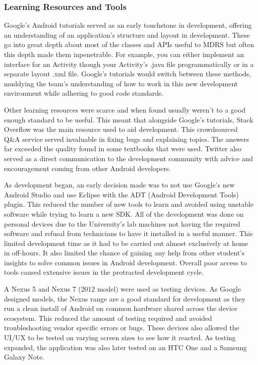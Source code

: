 \documentclass{l3proj}
\begin{document}
\subsubsection{Learning Resources and Tools} Google's Android tutorials served as an early touchstone in development, offering an understanding of an application's structure and layout in development. These go into great depth about most of the classes and APIs useful to MDRS but often this depth made them inpenetrable. For example, you can either implement an interface for an Activity though your Activity's .java file programmatically or in a separate layout .xml file. Google's tutorials would switch between these methods, muddying the team's understanding of how to work in this new development environment while adhering to good code standards.

Other learning resources were scarce and when found usually weren't to a good enough standard to be useful. This meant that alongside Google's tutorials, Stack Overflow was the main resource used to aid development. This crowdsourced Q\&A service served invaluable in fixing bugs and explaining topics. The answers far exceeded the quality found in some textbooks that were used. Twitter also served as a direct communication to the development community with advice and encouragement coming from other Android developers.

As development began, an early decision made was to not use Google's new Android Studio and use Eclipse with the ADT (Android Development Tools) plugin. This reduced the number of new tools to learn and avoided using unstable software while trying to learn a new SDK. All of the development was done on personal devices due to the University's lab machines not having the required software and refusal from technicians to have it installed in a useful manner. This limited development time as it had to be carried out almost exclusively at home in off-hours. It also limited the chance of gaining any help from other student's insights to solve common issues in Android development. Overall poor access to tools caused extensive issues in the protracted  development cycle.

A Nexus 5 and Nexus 7 (2012 model) were used as testing devices. As Google designed models, the Nexus range are a good standard for development as they run a clean install of Android on common hardware shared across the device ecosystem. This reduced the amount of testing required and avoided troubleshooting vendor specific errors or bugs. These devices also allowed the UI/UX to be tested on varying screen sizes to see how it reacted. As testing expanded, the application was also later tested on an HTC One and a Samsung Galaxy Note.
\end{document}
